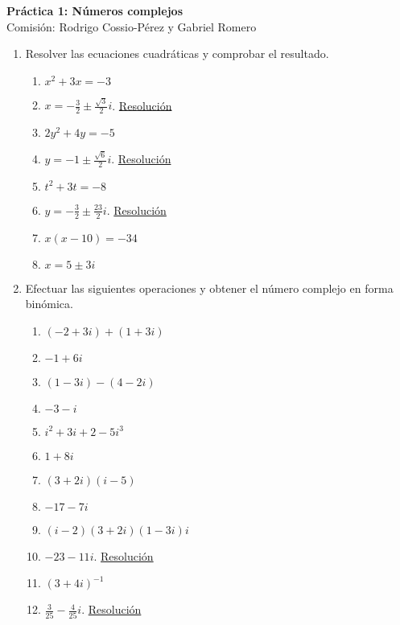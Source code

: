 \documentclass[a4paper]{article}
\newcommand{\answer}{\item[**]}
\newcommand{\exercise}{\item}
\newcommand{\df}[2]{\displaystyle\frac{#1}{#2}}
\begin{document}
\noindent \hrulefill 
\vspace{-7pt}
\begin{center} 
	\textbf{ Práctica 1: Números complejos } \\
	Comisión: Rodrigo Cossio-Pérez y Gabriel Romero
\end{center}
\vspace{-10pt}
\hrulefill


\begin{enumerate}

	\exercise Resolver las ecuaciones cuadráticas y comprobar el resultado.
	\begin{multicols}{2}
	\begin{enumerate} [label=(\alph*)]
		
		\item $x^2+3x=-3$
		\answer $x=-\df{3}{2} \pm \df{\sqrt{3}}{2} i$. \href{https://youtu.be/WhcMOb6DzU0}{Resolución}

		\item $2y^2+4y=-5$
		\answer $y=-1 \pm \df{\sqrt{6}}{2} i$. \href{https://youtu.be/cED7hCNJGus}{Resolución}

		\item $t^2+3t=-8$
		\answer $y=-\df{3}{2} \pm \df{23}{2} i$. \href{https://youtu.be/IPSEzvEefZw}{Resolución}

		\item $x(x-10)=-34$
		\answer $x=5\pm3i$

	\end{enumerate}
	\end{multicols}

	\exercise Efectuar las siguientes operaciones y obtener el número complejo en forma binómica.
	\begin{multicols}{2}
	\begin{enumerate} [label=(\alph*)]
		
		\item $(-2+3i)+(1+3i)$
		\answer $-1+6i$

		\item $(1-3i)-(4-2i)$
		\answer $-3-i$

		\item $i^2+3i+2-5i^3$
		\answer $1+8i$

		\item $(3+2i)(i-5)$
		\answer $-17-7i$

		\item $(i-2)(3+2i)(1-3i)i$
		\answer $-23-11i$. \href{https://youtu.be/bxbLVzLAH9k}{Resolución}

		\item $(3+4i)^{-1}$
		\answer $\df{3}{25}-\df{4}{25}i$. \href{https://youtu.be/BarDCwpxapc}{Resolución}


\end{enumerate}
\end{multicols}
\end{enumerate}
\end{document}

